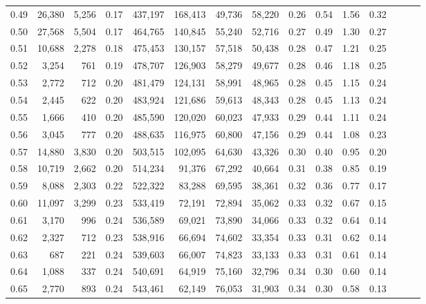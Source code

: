 \begin{tabular}{rrrrrrrrrrrrrrr}
0.49 &  26,380 &  5,256 &  0.17 &  437,197 &  168,413 &   49,736 &   58,220 &  0.26 &  0.54 &  1.56 &      0.32 \\
0.50 &  27,568 &  5,504 &  0.17 &  464,765 &  140,845 &   55,240 &   52,716 &  0.27 &  0.49 &  1.30 &      0.27 \\
0.51 &  10,688 &  2,278 &  0.18 &  475,453 &  130,157 &   57,518 &   50,438 &  0.28 &  0.47 &  1.21 &      0.25 \\
0.52 &   3,254 &    761 &  0.19 &  478,707 &  126,903 &   58,279 &   49,677 &  0.28 &  0.46 &  1.18 &      0.25 \\
0.53 &   2,772 &    712 &  0.20 &  481,479 &  124,131 &   58,991 &   48,965 &  0.28 &  0.45 &  1.15 &      0.24 \\
0.54 &   2,445 &    622 &  0.20 &  483,924 &  121,686 &   59,613 &   48,343 &  0.28 &  0.45 &  1.13 &      0.24 \\
0.55 &   1,666 &    410 &  0.20 &  485,590 &  120,020 &   60,023 &   47,933 &  0.29 &  0.44 &  1.11 &      0.24 \\
0.56 &   3,045 &    777 &  0.20 &  488,635 &  116,975 &   60,800 &   47,156 &  0.29 &  0.44 &  1.08 &      0.23 \\
0.57 &  14,880 &  3,830 &  0.20 &  503,515 &  102,095 &   64,630 &   43,326 &  0.30 &  0.40 &  0.95 &      0.20 \\
0.58 &  10,719 &  2,662 &  0.20 &  514,234 &   91,376 &   67,292 &   40,664 &  0.31 &  0.38 &  0.85 &      0.19 \\
0.59 &   8,088 &  2,303 &  0.22 &  522,322 &   83,288 &   69,595 &   38,361 &  0.32 &  0.36 &  0.77 &      0.17 \\
0.60 &  11,097 &  3,299 &  0.23 &  533,419 &   72,191 &   72,894 &   35,062 &  0.33 &  0.32 &  0.67 &      0.15 \\
0.61 &   3,170 &    996 &  0.24 &  536,589 &   69,021 &   73,890 &   34,066 &  0.33 &  0.32 &  0.64 &      0.14 \\
0.62 &   2,327 &    712 &  0.23 &  538,916 &   66,694 &   74,602 &   33,354 &  0.33 &  0.31 &  0.62 &      0.14 \\
0.63 &     687 &    221 &  0.24 &  539,603 &   66,007 &   74,823 &   33,133 &  0.33 &  0.31 &  0.61 &      0.14 \\
0.64 &   1,088 &    337 &  0.24 &  540,691 &   64,919 &   75,160 &   32,796 &  0.34 &  0.30 &  0.60 &      0.14 \\
0.65 &   2,770 &    893 &  0.24 &  543,461 &   62,149 &   76,053 &   31,903 &  0.34 &  0.30 &  0.58 &      0.13 \\

\end{tabular}
